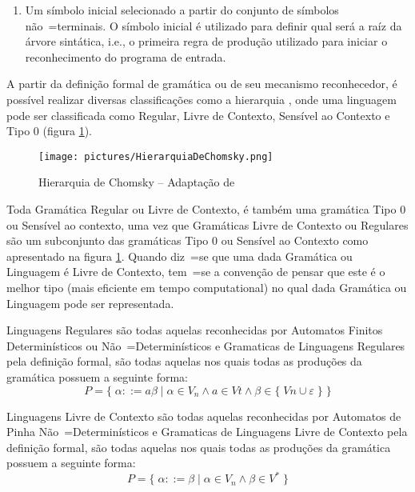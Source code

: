 {\begin{enumerate}
        \item Um símbolo inicial selecionado a partir do conjunto de símbolos não~=terminais.
        O símbolo inicial é utilizado para definir qual será a raíz da árvore sintática,
        i.e.,
        o primeira regra de produção utilizado para iniciar o reconhecimento do programa de entrada.
    \end{enumerate}

    A partir da definição formal de gramática ou de seu mecanismo reconhecedor,
    é possível realizar diversas classificações como a
    hierarquia ,
    onde uma linguagem pode ser classificada como Regular,
    Livre de Contexto,
    Sensível ao Contexto e
    Tipo 0 (figura \ref{fig:pictures/HierarquiaDeChomsky.png}).
    \begin{figure}[H]
    \centering
    \texttt{[image: pictures/HierarquiaDeChomsky.png]}
    \caption{Hierarquia de Chomsky -- Adaptação de }
    \label{fig:pictures/HierarquiaDeChomsky.png}
    \end{figure}

    Toda Gramática Regular ou Livre de Contexto,
    é também uma gramática Tipo 0 ou Sensível ao contexto,
    uma vez que Gramáticas Livre de Contexto ou Regulares são um
    subconjunto das gramáticas Tipo 0 ou Sensível ao Contexto como
    apresentado na figura \ref{fig:pictures/HierarquiaDeChomsky.png}.
    Quando diz~=se que uma dada Gramática ou Linguagem é Livre de Contexto,
    tem~=se a convenção de pensar que este é o melhor tipo (mais eficiente em tempo
    computational) no qual dada Gramática ou Linguagem pode ser representada.

    Linguagens Regulares são todas aquelas reconhecidas por
    Automatos Finitos Determinísticos ou
    Não~=Determinísticos e
    Gramaticas de Linguagens Regulares pela definição formal,
    são todas aquelas nos quais todas as produções da gramática possuem a seguinte forma:
    $$ P = \{\; \alpha ::= a \beta \;|\; \alpha \in V_n \land a \in Vt
                \land \beta \in \{\; Vn \cup \varepsilon\; \} \;\} $$

    Linguagens Livre de Contexto são todas aquelas
    reconhecidas por Automatos de Pinha
    Não~=Determinísticos e
    Gramaticas de Linguagens Livre de Contexto pela definição formal,
    são todas aquelas nos quais todas as produções da gramática possuem a seguinte forma:
    $$ P = \{\; \alpha ::= \beta \;|\; \alpha \in V_n \land \beta \in V^* \;\} $$

}
